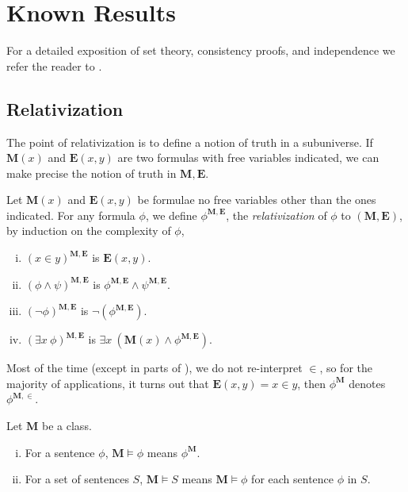 \section{Known Results}

For a detailed exposition of set theory, consistency proofs, and independence we refer the reader to \autocite{kunen1980}.

\subsection{Relativization}


\newcommand*{\M}{\mathbf{M}}
\newcommand*{\E}{\mathbf{E}}
\renewcommand*{\models}{\vDash}
\newcommand*{\Axiom}[1]{{\normalfont\textsf{#1}}}


The point of relativization is to define a notion of truth in a subuniverse.
If \(\mathbf{M}(x)\) and \(\mathbf{E}(x,y)\) are two formulas with free variables indicated,
we can make precise the notion of truth in \(\mathbf{M},\mathbf{E}\).
\begin{definition}
    Let \(\mathbf{M}(x)\) and \(\mathbf{E}(x,y)\) be formulae no free variables other than the ones indicated.
    For any formula \(\phi\), we define \(\phi^{\mathbf{M},\mathbf{E}}\), the \emph{relativization} of \(\phi\) to \((\M,\E)\),
    by induction on the complexity of \(\phi\),
    \begin{enumerate}[i.]
        \item \((x\in y)^{\M,\E}\) is \(\E(x,y)\).
        \item \((\phi\land\psi)^{\M,\E}\) is \(\phi^{\M,\E}\land\psi^{\M,\E}\).
        \item \((\lnot\phi)^{\M,\E}\) is \(\lnot (\phi^{\M,\E})\).
        \item \((\exists x\ \phi)^{\M,\E}\) is \(\exists x\ (\M(x) \land \phi^{\M,\E})\).
    \end{enumerate}
\end{definition}
\begin{remark}
    Most of the time (except in parts of ), we do not re-interpret \(\in\),
    so for the majority of applications, it turns out that \(\E(x,y) = x\in y\),
    then \(\phi^\M\) denotes \(\phi^{\M,\in}\).
\end{remark}

\begin{definition}
    Let \(\M\) be a class.
    \begin{enumerate}[i.]
        \item For a sentence \(\phi\), \(\M\models\phi\) means \(\phi^\M\).
        \item For a set of sentences \(S\), \(\M\models S\) means \(\M\models\phi\) for each sentence \(\phi\) in \(S\).
    \end{enumerate}
\end{definition}

